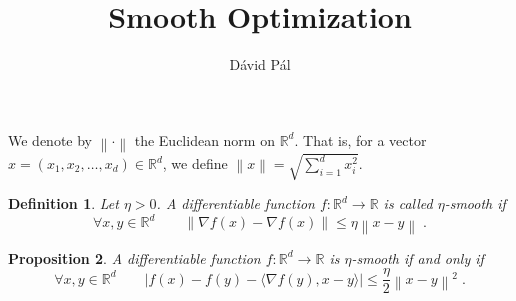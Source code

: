 \documentclass[12pt]{article}
\title{Smooth Optimization}
\author{D\'avid P\'al}
\newtheorem{definition}{Definition}
\newtheorem{proposition}[definition]{Proposition}
\newcommand{\R}{\mathbb{R}}
\newcommand{\grad}{\nabla}
\newcommand{\norm}[1]{\left\|#1\right\|}
\begin{document}
\maketitle

We denote by $\norm{\cdot}$ the Euclidean norm on $\R^d$. That is, for a vector $x = (x_1, x_2, \dots, x_d) \in \R^d$,
we define $\norm{x} = \sqrt{\sum_{i=1}^d x_i^2}$.

\begin{definition}
Let $\eta > 0$. A differentiable function $f:\R^d \to \R$ is called \emph{$\eta$-smooth} if
\begin{equation}
\label{equation:smoothness-definition}
\forall x,y \in \R^d \qquad \norm{\grad f(x) - \grad f(x)} \le \eta \norm{x - y} \; .
\end{equation}
\end{definition}

\begin{proposition}
A differentiable function $f:\R^d \to \R$ is $\eta$-smooth if and only if
\begin{equation}
\label{equation:smoothness-proposition}
\forall x,y \in \R^d \qquad \left| f(x) - f(y) - \langle \grad f(y), x - y \rangle \right| \le \frac{\eta}{2} \norm{x - y}^2 \; .
\end{equation}
\end{proposition}
\end{document}

